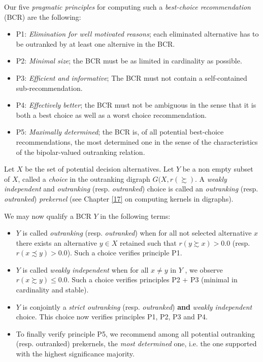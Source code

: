 Our five \emph{pragmatic principles} for computing such a \emph{best-choice recommendation} (BCR) are the following:
\begin{itemize}
\item [] P1: \emph{Elimination for well motivated reasons}; each eliminated alternative has to be outranked by at least one alternive in the BCR.
\item [] P2: \emph{Minimal size}; the BCR must be as limited in cardinality as possible.
\item [] P3: \emph{Efficient and informative}; The BCR must not contain a self-contained sub-recommendation.
\item [] P4: \emph{Effectively better}; the BCR must not be ambiguous in the sense that it is both a best choice as well as a worst choice recommendation.
\item [] P5: \emph{Maximally determined}; the BCR is, of all potential best-choice recommendations, the most determined one in the sense of the characteristics of the bipolar-valued outranking relation.
\end{itemize}

Let $X$ be the set of potential decision alternatives. Let $Y$ be a non empty subset of $X$, called a \emph{choice} in the outranking digraph $G(X,r(\succsim )$. A \emph{weakly independent} and \emph{outranking} (resp. \emph{outranked}) choice is called an \emph{outranking} (resp. \emph{outranked}) \emph{prekernel} (see Chapter \ref{17} on computing kernels in digraphs).

We may now qualify a BCR $Y$ in the following terms:
\begin{itemize}
\item $Y$ is called \emph{outranking} (resp. \emph{outranked}) when for all not selected alternative $x$ there exists an alternative $y \in X$ retained such that $r(y \succsim x) > 0.0$ (resp. $r(x \precsim y) > 0.0$). Such a choice verifies principle P1.
\item $Y$ is called \emph{weakly independent} when for all $x \neq y$ in $Y$ , we observe $r(x \succsim y) \leq 0.0$. Such a choice verifies principles P2 + P3 (minimal in cardinality and stable).
\item $Y$ is conjointly a \emph{strict  outranking} (resp. \emph{outranked}) \textbf{and} \emph{weakly independent} choice. This choice now verifies principles P1, P2, P3 and P4.
\item To finally verify principle P5, we recommend among all potential outranking (resp. outranked) prekernels, the \emph{most determined} one, i.e. the one supported with the highest significance majority.
\end{itemize}

